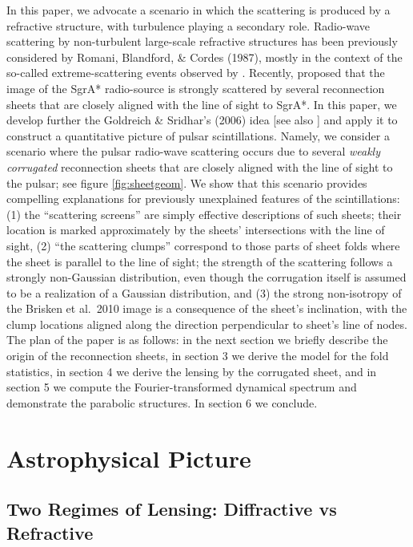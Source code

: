 \documentclass[useAMS,usenatbib]{mn2e}
\begin{document}
In this paper, we advocate a scenario in which the scattering is produced by a refractive structure, 
with turbulence playing a secondary role.
Radio-wave scattering by non-turbulent large-scale refractive structures has been previously
considered by Romani, Blandford, \& Cordes (1987), mostly in the context of the so-called
extreme-scattering events observed by
\cite{1987Natur.326..675F}. Recently, \cite{2006ApJ...640L.159G}
proposed that the image of the SgrA* radio-source is  
strongly scattered by several reconnection sheets that are closely aligned with the line of sight to
SgrA*.
In this paper, we develop further the Goldreich \& Sridhar's (2006) idea [see also \cite{2012MNRAS.421L.132P}] 
and apply it to construct a quantitative
picture of pulsar scintillations. Namely, we consider a scenario where
the pulsar radio-wave scattering occurs due to several {\it weakly corrugated} 
reconnection sheets that are
closely aligned with the line of sight to the pulsar; see figure \ref{fig:sheetgeom}.  We show that this scenario provides
compelling explanations for previously unexplained features of the scintillations: 
(1)  the ``scattering screens'' are simply effective descriptions of such sheets; their location is marked 
approximately
by the sheets' intersections with the line of sight, (2) ``the scattering clumps'' correspond to 
those parts of sheet folds where the sheet is parallel 
to
the line of sight; the strength of the scattering follows a strongly non-Gaussian distribution, even though
the corrugation itself is assumed to be a realization of a Gaussian distribution, and (3) the
strong non-isotropy of the Brisken et al.~2010 image is a consequence of the sheet's inclination, 
with the clump locations aligned along the direction perpendicular to sheet's line of nodes. The plan of the paper is
as follows: in the next section we briefly describe the origin of the
reconnection sheets, in section 3  we derive the model for the fold statistics,
in section 4 we derive the lensing by the corrugated sheet, and in section 5 we compute the
Fourier-transformed dynamical spectrum and demonstrate the parabolic structures. In section 6 we conclude.



\section{Astrophysical Picture}

\subsection{Two Regimes of Lensing: Diffractive vs Refractive}
\end{document}
